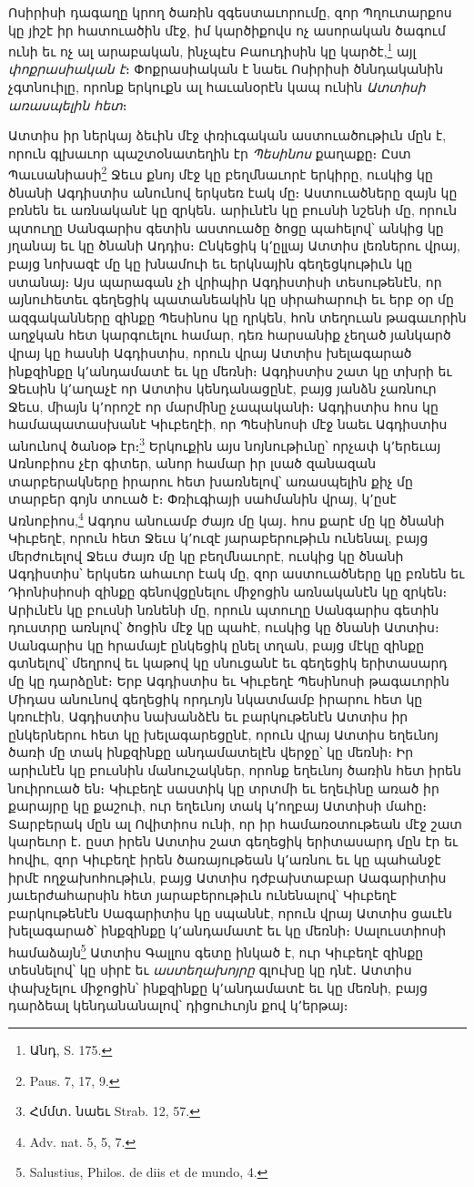 \documentclass{article}
\begin{document}
{Ոսիրիսի դագաղը կրող ծառին զգեստաւորումը, զոր Պղուտարքոս կը յիշէ իր հատուածին մէջ, իմ կարծիքովս ոչ ասորական ծագում ունի եւ ոչ ալ արաբական, ինչպէս Բաուդիսին կը կարծէ,\footnote{Անդ, S. 175.} այլ \emph{փոքրասիական է}։ Փոքրասիական է նաեւ Ոսիրիսի ծննդականին չգտնուիլը, որոնք երկուքն ալ հաւանօրէն կապ ունին \emph{Ատտիսի առասպելին հետ}։

Ատտիս իր ներկայ ձեւին մէջ փռիւգական աստուածութիւն մըն է, որուն գլխաւոր պաշտօնատեղին էր \emph{Պեսինոս} քաղաքը։ Ըստ Պաւսանիասի\footnote{Paus. 7, 17, 9.} Ջեւս քնոյ մէջ կը բեղմնաւորէ երկիրը, ուսկից կը ծնանի Ագդիստիս անունով երկսեռ էակ մը։ Աստուածները զայն կը բռնեն եւ առնականէ կը զրկեն․ արիւնէն կը բուսնի նշենի մը, որուն պտուղը Սանգարիս գետին աստուածը ծոցը պահելով՝ անկից կը յղանայ եւ կը ծնանի Ադդիս։ Ընկեցիկ կ՚ըլլայ Ատտիս լեռներու վրայ, բայց նոխազէ մը կը խնամուի եւ երկնային գեղեցկութիւն կը ստանայ։ Այս պարագան չի վրիպիր Ագդիստիսի տեսութենէն, որ այնուհետեւ գեղեցիկ պատանեակին կը սիրահարուի եւ երբ օր մը ազգականները զինքը Պեսինոս կը ղրկեն, հոն տեղուան թագաւորին աղջկան հետ կարգուելու համար, դեռ հարսանիք չեղած յանկարծ վրայ կը հասնի Ագդիստիս, որուն վրայ Ատտիս խելագարած ինքզինքը կ՚անդամատէ եւ կը մեռնի։ Ագդիստիս շատ կը տխրի եւ Ջեւսին կ՚աղաչէ որ Ատտիս կենդանացընէ, բայց յանձն չառնուր Ջեւս, միայն կ՚որոշէ որ մարմինը չապականի։ Ագդիստիս հոս կը համապատասխանէ Կիւբեղէի, որ Պեսինոսի մէջ նաեւ Ագդիստիս անունով ծանօթ էր։\footnote{Հմմտ․ նաեւ Strab. 12, 57.} Երկուքին այս նոյնութիւնը՝ որչափ կ՚երեւայ Առնոբիոս չէր գիտեր, անոր համար իր լսած զանազան տարբերակները իրարու հետ խառնելով՝ առասպելին քիչ մը տարբեր գոյն տուած է։ Փռիւգիայի սահմանին վրայ, կ՚ըսէ Առնոբիոս,\footnote{Adv. nat. 5, 5, 7.} Ագդոս անուամբ ժայռ մը կայ․ հոս քարէ մը կը ծնանի Կիւբեղէ, որուն հետ Ջեւս կ՚ուզէ յարաբերութիւն ունենալ, բայց մերժուելով Ջեւս ժայռ մը կը բեղմնաւորէ, ուսկից կը ծնանի Ագդիստիս՝ երկսեռ ահաւոր էակ մը, զոր աստուածները կը բռնեն եւ Դիոնիսիոսի զինքը գենովցընելու միջոցին առնականէն կը զրկեն։ Արիւնէն կը բուսնի նռնենի մը, որուն պտուղը Սանգարիս գետին դուստրը առնլով՝ ծոցին մէջ կը պահէ, ուսկից կը ծնանի Ատտիս։ Սանգարիս կը հրամայէ ընկեցիկ ընել տղան, բայց մէկը զինքը գտնելով՝ մեղրով եւ կաթով կը սնուցանէ եւ գեղեցիկ երիտասարդ մը կը դարձընէ։ Երբ Ագդիստիս եւ Կիւբեղէ Պեսինոսի թագաւորին Միդաս անունով գեղեցիկ որդւոյն նկատմամբ իրարու հետ կը կռուէին, Ագդիստիս նախանձէն եւ բարկութենէն Ատտիս իր ընկերներու հետ կը խելագարեցընէ, որուն վրայ Ատտիս եղեւնոյ ծառի մը տակ ինքզինքը անդամատելէն վերջը՝ կը մեռնի։ Իր արիւնէն կը բուսնին մանուշակներ, որոնք եղեւնոյ ծառին հետ իրեն նուիրուած են։ Կիւբեղէ սաստիկ կը տրտմի եւ եղեւինը առած իր քարայրը կը քաշուի, ուր եղեւնոյ տակ կ՚ողբայ Ատտիսի մահը։ Տարբերակ մըն ալ Ովիտիոս ունի, որ իր համառօտութեան մէջ շատ կարեւոր է․ ըստ իրեն Ատտիս շատ գեղեցիկ երիտասարդ մըն էր եւ հովիւ, զոր Կիւբեղէ իրեն ծառայութեան կ՚առնու եւ կը պահանջէ իրմէ ողջախոհութիւն, բայց Ատտիս դժբախտաբար Աագարիտիս յաւերժահարսին հետ յարաբերութիւն ունենալով՝ Կիւբեղէ բարկութենէն Սագարիտիս կը սպաննէ, որուն վրայ Ատտիս ցաւէն խելագարած՝ ինքզինքը կ՚անդամատէ եւ կը մեռնի։ Սալուստիոսի համաձայն\footnote{Salustius, Philos. de diis et de mundo, 4.} Ատտիս Գալլոս գետը ինկած է, ուր Կիւբեղէ զինքը տեսնելով՝ կը սիրէ եւ \emph{աստեղախոյրը} գլուխը կը դնէ․ Ատտիս փախչելու միջոցին՝ ինքզինքը կ՚անդամատէ եւ կը մեռնի, բայց դարձեալ կենդանանալով՝ դիցուհւոյն քով կ՚երթայ։

}
\end{document}
